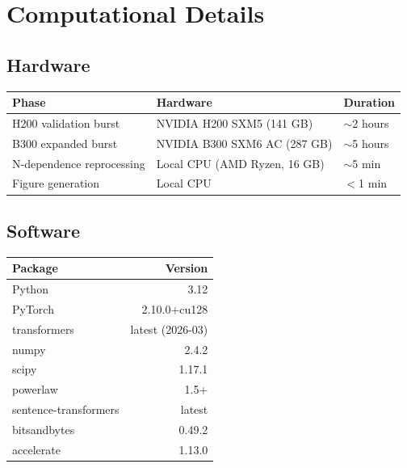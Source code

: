 \documentclass[11pt,letterpaper]{article}
\begin{document}
\section{Computational Details}
\label{sec:compute}

\subsection{Hardware}

\begin{tabular}{lll}
\toprule
\textbf{Phase} & \textbf{Hardware} & \textbf{Duration} \\
\midrule
H200 validation burst & NVIDIA H200 SXM5 (141 GB) & $\sim$2 hours \\
B300 expanded burst & NVIDIA B300 SXM6 AC (287 GB) & $\sim$5 hours \\
N-dependence reprocessing & Local CPU (AMD Ryzen, 16 GB) & $\sim$5 min \\
Figure generation & Local CPU & $<$1 min \\
\bottomrule
\end{tabular}

\subsection{Software}

\begin{tabular}{lr}
\toprule
\textbf{Package} & \textbf{Version} \\
\midrule
Python & 3.12 \\
PyTorch & 2.10.0+cu128 \\
transformers & latest (2026-03) \\
numpy & 2.4.2 \\
scipy & 1.17.1 \\
powerlaw & 1.5+ \\
sentence-transformers & latest \\
bitsandbytes & 0.49.2 \\
accelerate & 1.13.0 \\
\bottomrule
\end{tabular}
\end{document}
